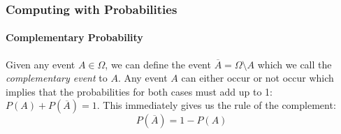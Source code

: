 









\subsubsection{Computing with Probabilities}

\paragraph{Complementary Probability}
Given any event $A \in \Omega$, we can define the event $\overline{A} = \Omega \setminus A$ which we call the \emph{complementary event} to $A$. Any event $A$ can either occur or not occur which implies that the probabilities for both cases must add up to 1: $P(A) + P(\overline{A}) = 1$. This immediately gives us the rule of the complement:
\begin{equation}
 P(\overline{A}) = 1 - P(A)
\end{equation}


